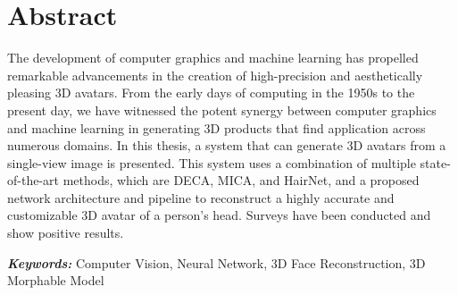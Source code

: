 




\section*{Abstract}

The development of computer graphics and machine learning has propelled remarkable advancements in the creation of high-precision and aesthetically pleasing 3D avatars. From the early days of computing in the 1950s to the present day, we have witnessed the potent synergy between computer graphics and machine learning in generating 3D products that find application across numerous domains. In this thesis, a system that can generate 3D avatars from a single-view image is presented. This system uses a combination of multiple state-of-the-art methods, which are DECA, MICA, and HairNet, and a proposed network architecture and pipeline to reconstruct a highly accurate and customizable 3D avatar of a person's head. Surveys have been conducted and show positive results.

\textbf{\textit{Keywords:}} Computer Vision, Neural Network, 3D Face Reconstruction, 3D Morphable Model